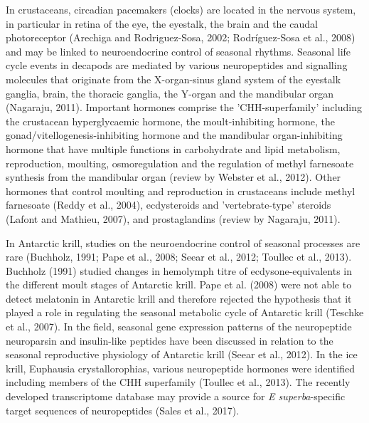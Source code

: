 In crustaceans, circadian pacemakers (clocks) are located in the nervous system, in particular in retina of the eye, the eyestalk, the brain and the caudal photoreceptor (Arechiga and Rodriguez-Sosa, 2002; Rodríguez‐Sosa et al., 2008) and may be linked to neuroendocrine control of seasonal rhythms. Seasonal life cycle events in decapods are mediated by various neuropeptides and signalling molecules that originate from the X-organ-sinus gland system of the eyestalk ganglia, brain, the thoracic ganglia, the Y-organ and the mandibular organ (Nagaraju, 2011). Important hormones comprise the 'CHH-superfamily' including the crustacean hyperglycaemic hormone, the moult-inhibiting hormone, the gonad/vitellogenesis-inhibiting hormone and the mandibular organ-inhibiting hormone that have multiple functions in carbohydrate and lipid metabolism, reproduction, moulting, osmoregulation and the regulation of methyl farnesoate synthesis from the mandibular organ (review by Webster et al., 2012). Other hormones that control moulting and reproduction in crustaceans include methyl farnesoate (Reddy et al., 2004), ecdysteroids and 'vertebrate-type' steroids (Lafont and Mathieu, 2007), and prostaglandins (review by Nagaraju, 2011).

In Antarctic krill, studies on the neuroendocrine control of seasonal processes are rare (Buchholz, 1991; Pape et al., 2008; Seear et al., 2012; Toullec et al., 2013). Buchholz (1991) studied changes in hemolymph titre of ecdysone-equivalents in the different moult stages of Antarctic krill. Pape et al. (2008) were not able to detect melatonin in Antarctic krill and therefore rejected the hypothesis that it played a role in regulating the seasonal metabolic cycle of Antarctic krill (Teschke et al., 2007).  In the field, seasonal gene expression patterns of the neuropeptide neuroparsin and insulin-like peptides have been discussed in relation to the seasonal reproductive physiology of Antarctic krill (Seear et al., 2012). In the ice krill, Euphausia crystallorophias, various neuropeptide hormones were identified including members of the CHH superfamily (Toullec et al., 2013). The recently developed transcriptome database may provide a source for \textit{E superba}-specific target sequences of neuropeptides (Sales et al., 2017). 

